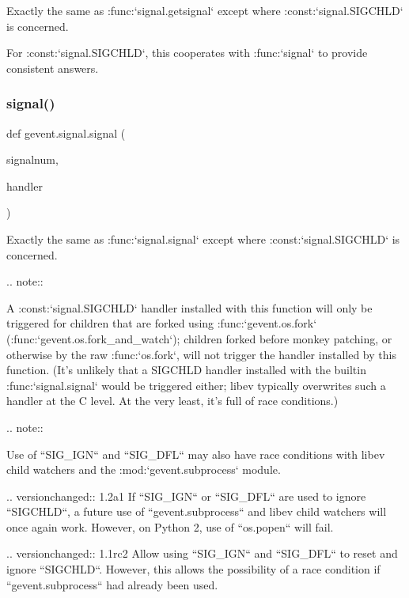 \begin{DoxyVerb}Exactly the same as :func:`signal.getsignal` except where
:const:`signal.SIGCHLD` is concerned.

For :const:`signal.SIGCHLD`, this cooperates with :func:`signal`
to provide consistent answers.
\end{DoxyVerb}
 \mbox{\label{namespacegevent_1_1signal_a9a9468db1089a9857115dba958e5f26e}} 
\subsubsection{\texorpdfstring{signal()}{signal()}}
{\footnotesize\ttfamily def gevent.\+signal.\+signal (\begin{DoxyParamCaption}\item[{}]{signalnum,  }\item[{}]{handler }\end{DoxyParamCaption})}

\begin{DoxyVerb}Exactly the same as :func:`signal.signal` except where
:const:`signal.SIGCHLD` is concerned.

.. note::

   A :const:`signal.SIGCHLD` handler installed with this function
   will only be triggered for children that are forked using
   :func:`gevent.os.fork` (:func:`gevent.os.fork_and_watch`);
   children forked before monkey patching, or otherwise by the raw
   :func:`os.fork`, will not trigger the handler installed by this
   function. (It's unlikely that a SIGCHLD handler installed with
   the builtin :func:`signal.signal` would be triggered either;
   libev typically overwrites such a handler at the C level. At
   the very least, it's full of race conditions.)

.. note::

    Use of ``SIG_IGN`` and ``SIG_DFL`` may also have race conditions
    with libev child watchers and the :mod:`gevent.subprocess` module.

.. versionchanged:: 1.2a1
     If ``SIG_IGN`` or ``SIG_DFL`` are used to ignore ``SIGCHLD``, a
     future use of ``gevent.subprocess`` and libev child watchers
     will once again work. However, on Python 2, use of ``os.popen``
     will fail.

.. versionchanged:: 1.1rc2
     Allow using ``SIG_IGN`` and ``SIG_DFL`` to reset and ignore ``SIGCHLD``.
     However, this allows the possibility of a race condition if ``gevent.subprocess``
     had already been used.
\end{DoxyVerb}
 